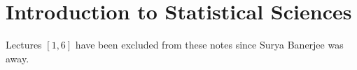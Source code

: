 \chapter{Introduction to Statistical Sciences}
Lectures $ [1,6] $ have been excluded from these notes since
Surya Banerjee was away.

